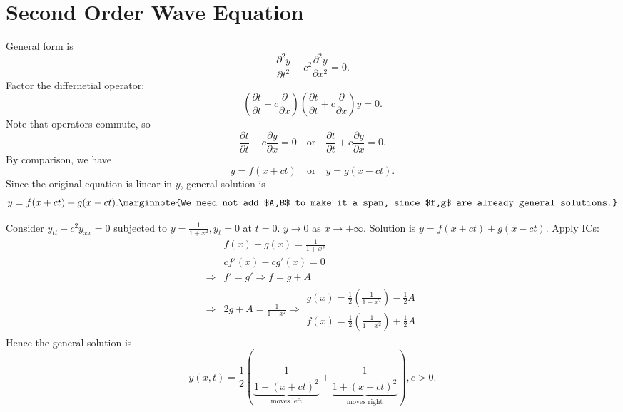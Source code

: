 \documentclass[10pt]{article}
\begin{document}
      \section{Second Order Wave Equation}
      General form is 
      \[
          \frac{\partial^2 y}{\partial t^2}-c^2 \frac{\partial^2 y}{\partial x^2}=0.  
      \]
      Factor the differnetial operator:
      \[
          \left( \frac{\partial t}{\partial t}-c\frac{\partial }{\partial x}   \right)\left( \frac{\partial t}{\partial t}+c\frac{\partial }{\partial x}   \right)y=0.
      \]
      Note that operators commute, so 
      \[
         \frac{\partial t}{\partial t}-c\frac{\partial y }{\partial x}   =0\quad \text{or}\quad  \frac{\partial t}{\partial t}+c\frac{\partial y}{\partial x} =0.
      \]
      By comparison, we have 
      \[
          y=f(x+ct)\quad \text{or}\quad y=g(x-ct).
      \]
      Since the original equation is linear in $y$, general solution is 
      \[
          y = f(x+ct)+g(x-ct).\marginnote{We need not add $A,B$ to make it a span, since $f,g$ are already general solutions.}
      \]
      \begin{example}
          Consider $ y_{tt}-c^2y_{xx}=0 $ subjected to $ y=\frac{1}{1+x^2}, y_t=0 $ at $t=0$. $ y\to 0 $ as $ x\to \pm \infty $. Solution is $ y=f(x+ct)+g(x-ct) $. Apply ICs:
          \begin{align*}
              &f(x)+g(x)=\frac{1}{1+x^2}\\
              &cf'(x)-cg'(x)=0\\
              \Longrightarrow & f'=g' \Longrightarrow f=g+A\\
              \Longrightarrow & 2g+A=\frac{1}{1+x^2} \Longrightarrow \begin{aligned}
                g(x)=\frac{1}{2}\left( \frac{1}{1+x^2}\right)-\frac{1}{2}A\\
                f(x)=\frac{1}{2}\left( \frac{1}{1+x^2}\right)+\frac{1}{2}A
              \end{aligned} 
          \end{align*}
          Hence the general solution is 
          \[
              y(x,t)=\frac{1}{2}\left( \underbrace{\frac{1}{1+(x+ct)^2}}_{\text{moves left}}+\underbrace{\frac{1}{1+(x-ct)^2}}_{\text{moves right}} \right), c>0.
          \]
      \end{example}
\end{document}
